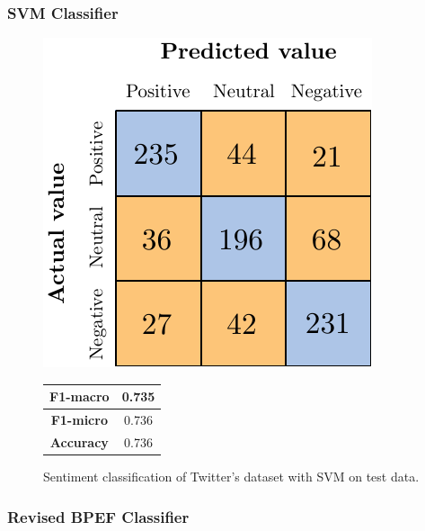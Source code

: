 \subsubsection{SVM Classifier}



\begin{figure}[H]
	\begin{minipage}[b]{0.6\linewidth}
		\centering
		\includegraphics[scale=1]{figures/conf_matrices/twitter_snt_svm/twitter_snt_svm_tst.pdf}
	\end{minipage}
	\begin{minipage}[b]{0.3\linewidth}
		\begin{tabular}[b]{ | c | c | } 
			\hline
			\textbf{F1-macro} & 0.735 \\
			\hline
			\textbf{F1-micro} & 0.736 \\ 
			\hline
			\textbf{Accuracy} & 0.736 \\ 
			\hline
		\end{tabular}
	\end{minipage}
	\caption{Sentiment classification of Twitter's dataset with SVM on test data.}
	\label{fig:tw_snt_svm_tst}
\end{figure}




\subsubsection{Revised BPEF Classifier}


